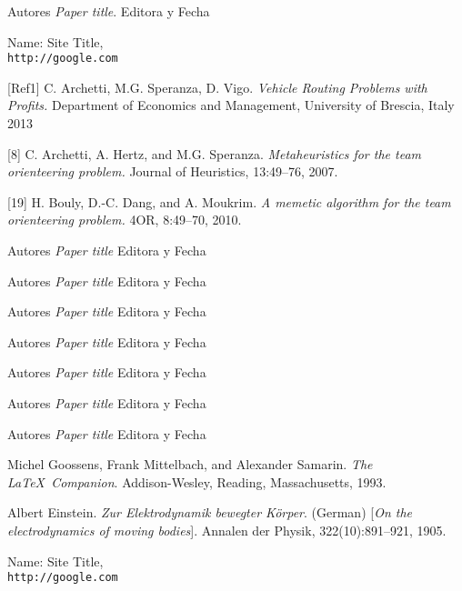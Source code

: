 \renewcommand\bibname{References}
\begin{thebibliography}{9}

Autores
\textit{Paper title}. 
Editora y Fecha
 
Name: Site Title,
\\\texttt{http://google.com}

[Ref1] C. Archetti, M.G. Speranza, D. Vigo.
\textit{Vehicle Routing Problems with Profits.} 
Department of Economics and Management, University of Brescia, Italy 2013

[8] C. Archetti, A. Hertz, and M.G. Speranza.
\textit{Metaheuristics for the team orienteering problem.} 
Journal of Heuristics, 13:49–76, 2007.

[19] H. Bouly, D.-C. Dang, and A. Moukrim.
\textit{A memetic algorithm for the team orienteering problem.}
4OR, 8:49–70, 2010.

Autores
\textit{Paper title}
Editora y Fecha

Autores
\textit{Paper title}
Editora y Fecha

Autores
\textit{Paper title}
Editora y Fecha

Autores
\textit{Paper title}
Editora y Fecha

Autores
\textit{Paper title}
Editora y Fecha

Autores
\textit{Paper title}
Editora y Fecha

Autores
\textit{Paper title}
Editora y Fecha




Michel Goossens, Frank Mittelbach, and Alexander Samarin. 
\textit{The \LaTeX\ Companion}. 
Addison-Wesley, Reading, Massachusetts, 1993.
 
Albert Einstein. 
\textit{Zur Elektrodynamik bewegter K{\"o}rper}. (German) 
[\textit{On the electrodynamics of moving bodies}]. 
Annalen der Physik, 322(10):891–921, 1905.
 
Name: Site Title,
\\\texttt{http://google.com}
\end{thebibliography}

